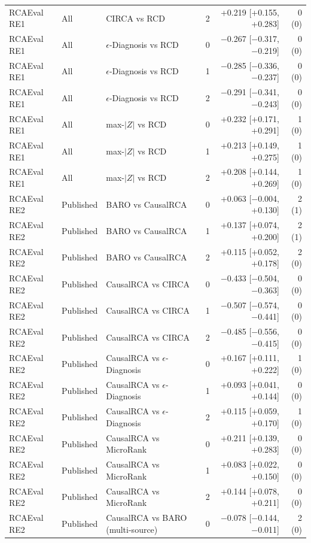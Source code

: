 {\begin{longtable}{llllrr}
RCAEval RE1 & All & CIRCA vs RCD & 2 & +0.219 [+0.155, +0.283] & 0 (0) \\
RCAEval RE1 & All & $\epsilon$-Diagnosis vs RCD & 0 & $-$0.267 [$-$0.317, $-$0.219] & 0 (0) \\
RCAEval RE1 & All & $\epsilon$-Diagnosis vs RCD & 1 & $-$0.285 [$-$0.336, $-$0.237] & 0 (0) \\
RCAEval RE1 & All & $\epsilon$-Diagnosis vs RCD & 2 & $-$0.291 [$-$0.341, $-$0.243] & 0 (0) \\
RCAEval RE1 & All & max-$|Z|$ vs RCD & 0 & +0.232 [+0.171, +0.291] & 1 (0) \\
RCAEval RE1 & All & max-$|Z|$ vs RCD & 1 & +0.213 [+0.149, +0.275] & 1 (0) \\
RCAEval RE1 & All & max-$|Z|$ vs RCD & 2 & +0.208 [+0.144, +0.269] & 1 (0) \\
RCAEval RE2 & Published & BARO vs CausalRCA & 0 & +0.063 [$-$0.004, +0.130] & 2 (1) \\
RCAEval RE2 & Published & BARO vs CausalRCA & 1 & +0.137 [+0.074, +0.200] & 2 (1) \\
RCAEval RE2 & Published & BARO vs CausalRCA & 2 & +0.115 [+0.052, +0.178] & 2 (0) \\
RCAEval RE2 & Published & CausalRCA vs CIRCA & 0 & $-$0.433 [$-$0.504, $-$0.363] & 0 (0) \\
RCAEval RE2 & Published & CausalRCA vs CIRCA & 1 & $-$0.507 [$-$0.574, $-$0.441] & 0 (0) \\
RCAEval RE2 & Published & CausalRCA vs CIRCA & 2 & $-$0.485 [$-$0.556, $-$0.415] & 0 (0) \\
RCAEval RE2 & Published & CausalRCA vs $\epsilon$-Diagnosis & 0 & +0.167 [+0.111, +0.222] & 1 (0) \\
RCAEval RE2 & Published & CausalRCA vs $\epsilon$-Diagnosis & 1 & +0.093 [+0.041, +0.144] & 0 (0) \\
RCAEval RE2 & Published & CausalRCA vs $\epsilon$-Diagnosis & 2 & +0.115 [+0.059, +0.170] & 1 (0) \\
RCAEval RE2 & Published & CausalRCA vs MicroRank & 0 & +0.211 [+0.139, +0.283] & 0 (0) \\
RCAEval RE2 & Published & CausalRCA vs MicroRank & 1 & +0.083 [+0.022, +0.150] & 0 (0) \\
RCAEval RE2 & Published & CausalRCA vs MicroRank & 2 & +0.144 [+0.078, +0.211] & 0 (0) \\
RCAEval RE2 & Published & CausalRCA vs BARO (multi-source) & 0 & $-$0.078 [$-$0.144, $-$0.011] & 2 (0) \\

\end{longtable}}

